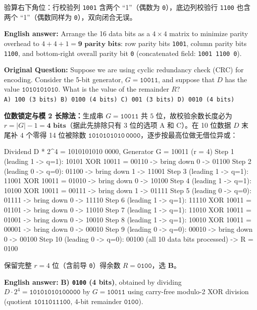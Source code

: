 验算右下角位：行校验列 \texttt{1001} 含两个 ``1''（偶数为 \texttt{0}），底边列校验行 \texttt{1100} 也含两个 ``1''（偶数同样为 \texttt{0}），双向闭合无误。

\textbf{English answer:} Arrange the 16 data bits as a $4\times 4$ matrix to minimize parity overhead to $4 + 4 + 1 = \mathbf{9\text{ parity bits}}$: row parity bits \texttt{1001}, column parity bits \texttt{1100}, and bottom-right overall parity bit \texttt{0} (concatenated field: \texttt{1001 1100 0}).



\textbf{Original Question:} Suppose we are using cyclic redundancy check (CRC) for encoding. Consider the 5-bit generator, $G = \mathtt{10011}$, and suppose that $D$ has the value $\mathtt{1010101010}$. What is the value of the remainder $R$? \\
\texttt{A) 100 (3 bits) \quad B) 0100 (4 bits) \quad C) 001 (3 bits) \quad D) 0010 (4 bits)}

\textbf{位数锁定与模 2 长除法：}生成串 $G = \mathtt{10011}$ 共 $5$ 位，故校验余数长度必为 $r = |G| - 1 = \mathbf{4\text{ bits}}$（据此先排除只有 3 位的选项 A 和 C）。在 10 位数据 $D$ 末尾补 $4$ 个零得 14 位被除数 $\mathtt{1010101010\,0000}$，逐步按最高位做无借位异或：

\begin{StudyCode}
Dividend D * 2^4 = 1010101010 0000,   Generator G = 10011 (r = 4)
  Step  1 (leading 1 -> q=1): 10101 XOR 10011 = 00110 -> bring down 0 -> 01100
  Step  2 (leading 0 -> q=0): 01100                   -> bring down 1 -> 11001
  Step  3 (leading 1 -> q=1): 11001 XOR 10011 = 01010 -> bring down 0 -> 10100
  Step  4 (leading 1 -> q=1): 10100 XOR 10011 = 00111 -> bring down 1 -> 01111
  Step  5 (leading 0 -> q=0): 01111                   -> bring down 0 -> 11110
  Step  6 (leading 1 -> q=1): 11110 XOR 10011 = 01101 -> bring down 0 -> 11010
  Step  7 (leading 1 -> q=1): 11010 XOR 10011 = 01001 -> bring down 0 -> 10010
  Step  8 (leading 1 -> q=1): 10010 XOR 10011 = 00001 -> bring down 0 -> 00010
  Step  9 (leading 0 -> q=0): 00010                   -> bring down 0 -> 00100
  Step 10 (leading 0 -> q=0): 00100 (all 10 data bits processed) -> R = 0100
\end{StudyCode}

保留完整 $r = 4$ 位（含前导 \texttt{0}）得余数 $R = \mathtt{0100}$，选 \textbf{B}。

\textbf{English answer:} \textbf{B) \texttt{0100} (4 bits)}, obtained by dividing $D\cdot 2^4 = \mathtt{10101010100000}$ by $G = \mathtt{10011}$ using carry-free modulo-2 XOR division (quotient $\mathtt{1011011100}$, 4-bit remainder $\mathtt{0100}$).


